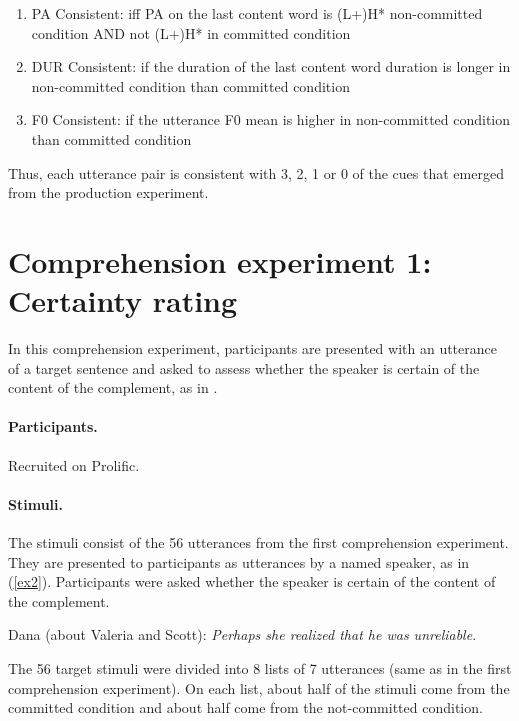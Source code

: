 \documentclass[dina4,12pt,fleqn]{article}
\newcommand{\6}{\mbox{$[\hspace*{-.6mm}[$}}
\newcommand{\9}{\mbox{$]\hspace*{-.6mm}]$}}
\begin{document}
\begin{itemize}[leftmargin=12pt]
\begin{enumerate}[noitemsep]
    \item PA Consistent: iff PA on the last content word is (L+)H* non-committed condition AND not (L+)H* in committed condition
    \item DUR Consistent: if the duration of the last content word duration is longer in non-committed condition than committed condition
    \item F0 Consistent: if the utterance F0 mean is higher in non-committed condition than committed condition
\end{enumerate}

Thus, each utterance pair is consistent with 3, 2, 1 or 0 of the cues that emerged from the production experiment. 

\end{itemize}


\section{Comprehension experiment 1: Certainty rating}

In this comprehension experiment, participants are presented with an utterance of a target sentence and asked to assess whether the speaker is certain of the content of the complement, as in \citealt{tonhauser-2016,stevens-etal-2017,tbd-variability}.

\paragraph{Participants.} Recruited on Prolific.

\paragraph{Stimuli.} The stimuli consist of the 56 utterances from the first comprehension experiment. They are presented to participants as utterances by a named speaker, as in (\ref{ex2}). Participants were asked whether the speaker is certain of the content of the complement.

\begin{exe}
\ex\label{ex2} Dana (about Valeria and Scott): {\em Perhaps she realized that he was unreliable}.
\end{exe}

The 56 target stimuli were divided into 8 lists of 7 utterances (same as in the first comprehension experiment). On each list, about half of the stimuli come from the committed condition and about half come from the not-committed condition. 
\end{document}
